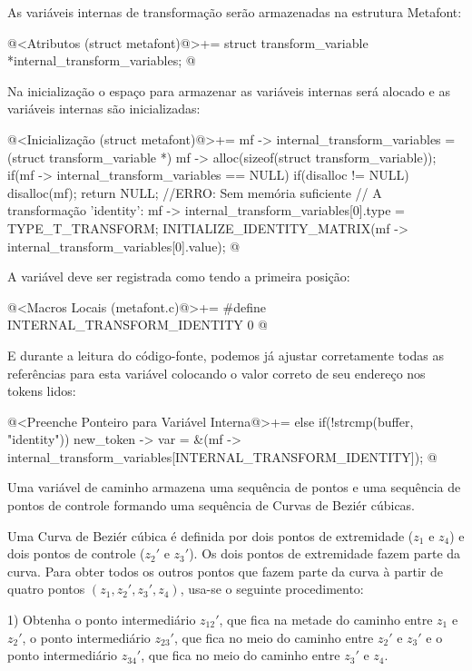 As variáveis internas de transformação serão armazenadas na estrutura
Metafont:

\iniciocodigo
@<Atributos (struct metafont)@>+=
struct transform_variable *internal_transform_variables;
@
\fimcodigo

Na inicialização o espaço para armazenar as variáveis internas será
alocado e as variáveis internas são inicializadas:

\iniciocodigo
@<Inicialização (struct metafont)@>+=
mf -> internal_transform_variables =
  (struct transform_variable *)
    mf -> alloc(sizeof(struct transform_variable));
if(mf -> internal_transform_variables == NULL){
  if(disalloc != NULL)
    disalloc(mf);
  return NULL; //ERRO: Sem memória suficiente
}
// A transformação 'identity':
mf -> internal_transform_variables[0].type = TYPE_T_TRANSFORM;
INITIALIZE_IDENTITY_MATRIX(mf -> internal_transform_variables[0].value);
@
\fimcodigo

A variável  deve ser registrada como tendo a
primeira posição:

\iniciocodigo
@<Macros Locais (metafont.c)@>+=
#define INTERNAL_TRANSFORM_IDENTITY 0
@
\fimcodigo

E durante a leitura do código-fonte, podemos já ajustar corretamente
todas as referências para esta variável colocando o valor correto de
seu endereço nos tokens lidos:

\iniciocodigo
@<Preenche Ponteiro para Variável Interna@>+=
else if(!strcmp(buffer, "identity"))
  new_token -> var =
          &(mf -> internal_transform_variables[INTERNAL_TRANSFORM_IDENTITY]);
@
\fimcodigo


Uma variável de caminho armazena uma sequência de pontos e uma
sequência de pontos de controle formando uma sequência de Curvas de
Beziér cúbicas.

Uma Curva de Beziér cúbica é definida por dois pontos de extremidade
($z_1$ e $z_4$) e dois pontos de controle ($z_2'$ e $z_3'$). Os dois
pontos de extremidade fazem parte da curva. Para obter todos os outros
pontos que fazem parte da curva à partir de quatro pontos $(z_1, z_2',
z_3', z_4)$, usa-se o seguinte procedimento:

1) Obtenha o ponto intermediário $z_{12}'$, que fica na metade do
caminho entre $z_1$ e $z_2'$, o ponto intermediário $z_{23}'$, que
fica no meio do caminho entre $z_2'$ e $z_3'$ e o ponto intermediário
$z_{34}'$, que fica no meio do caminho entre $z_3'$ e $z_4$.


